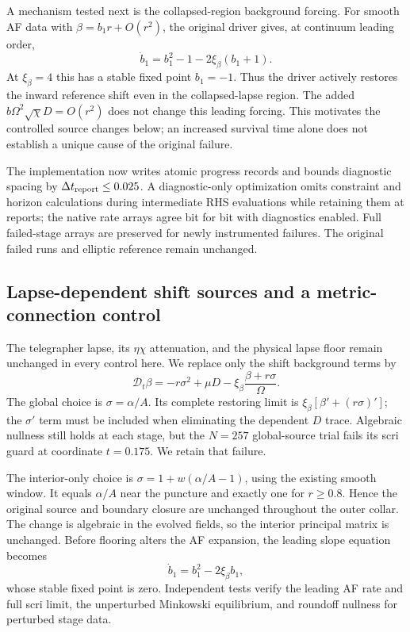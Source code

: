 \documentclass[11pt]{article}
\newcommand{\dt}{\mathcal D_t}
\begin{document}
A mechanism tested next is the collapsed-region background forcing. For smooth AF data with $\beta=b_1r+O(r^2)$, the original driver gives, at continuum leading order,
\begin{equation}
 \dot b_1=b_1^2-1-2\xi_\beta(b_1+1).
\end{equation}
At $\xi_\beta=4$ this has a stable fixed point $b_1=-1$. Thus the driver actively restores the inward reference shift even in the collapsed-lapse region. The added $b\Omega^2\sqrt\chi D=O(r^2)$ does not change this leading forcing. This motivates the controlled source changes below; an increased survival time alone does not establish a unique cause of the original failure.

The implementation now writes atomic progress records and bounds diagnostic spacing by $\Delta t_{\rm report}\leq0.025$. A diagnostic-only optimization omits constraint and horizon calculations during intermediate RHS evaluations while retaining them at reports; the native rate arrays agree bit for bit with diagnostics enabled. Full failed-stage arrays are preserved for newly instrumented failures. The original failed runs and elliptic reference remain unchanged.


\subsection{Lapse-dependent shift sources and a metric-connection control}
The telegrapher lapse, its $\eta\chi$ attenuation, and the physical lapse floor remain unchanged in every control here. We replace only the shift background terms by
\begin{equation}
 \dt\beta=-r\sigma^2+\mu D-\xi_\beta\frac{\beta+r\sigma}{\Omega}.
\end{equation}
The global choice is $\sigma=\alpha/A$. Its complete restoring limit is $\xi_\beta[\beta'+(r\sigma)']$; the $\sigma'$ term must be included when eliminating the dependent $D$ trace. Algebraic nullness still holds at each stage, but the $N=257$ global-source trial fails its scri guard at coordinate $t=0.175$. We retain that failure.

The interior-only choice is $\sigma=1+w(\alpha/A-1)$, using the existing smooth window. It equals $\alpha/A$ near the puncture and exactly one for $r\geq0.8$. Hence the original source and boundary closure are unchanged throughout the outer collar. The change is algebraic in the evolved fields, so the interior principal matrix is unchanged. Before flooring alters the AF expansion, the leading slope equation becomes
\begin{equation}
 \dot b_1=b_1^2-2\xi_\beta b_1,
\end{equation}
whose stable fixed point is zero. Independent tests verify the leading AF rate and full scri limit, the unperturbed Minkowski equilibrium, and roundoff nullness for perturbed stage data.
\end{document}
